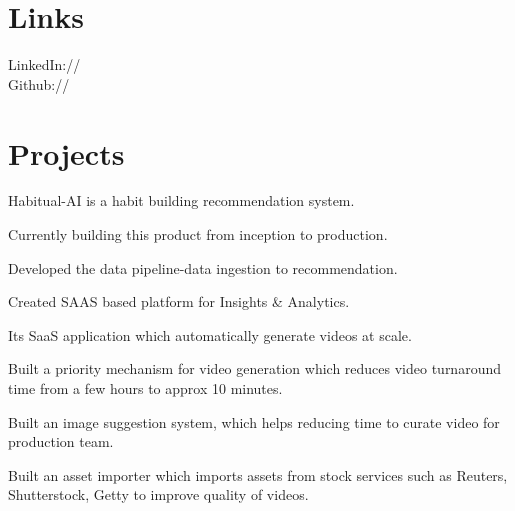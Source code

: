 \documentclass[]{deedy-resume-openfont}
\begin{document}
\begin{minipage}[t]{0.33\textwidth}

\section{Links} 
LinkedIn://  \href{https://www.linkedin.com/in/rohan-pithadiya}{} \\
Github:// \href{https://github.com/Rohanpithadiya}{} \\
\sectionsep

%
%

\end{minipage} 
\hfill
\begin{minipage}[t]{0.65\textwidth} 


\section{Projects}
\location{}
\vspace{\topsep} %
\begin{tightemize}
\item Habitual-AI is a habit building recommendation system.
\item Currently building this product from inception to production.
\item Developed the data pipeline-data ingestion to recommendation.
\item Created SAAS based platform for Insights \& Analytics.
\end{tightemize}
\sectionsep

\location{}
\begin{tightemize}
\item  Its SaaS application which automatically generate videos at scale.
\item Built a priority mechanism for video generation which reduces video turnaround time from a few hours to approx 10 minutes.
\item Built an image suggestion system, which helps reducing time to curate video for production team.
\item Built an asset importer which imports assets from stock services such as Reuters, Shutterstock, Getty to improve quality of videos.
\end{tightemize}
\sectionsep


\end{minipage}
\end{document}
